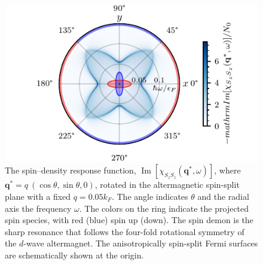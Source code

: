 \documentclass[aps,prl,reprint,twocolumns,superscriptaddress]{revtex4-2}
\DeclareMathOperator{\Imm}{Im}
\newcommand{\kF}{k_{F}}
\begin{document}
	\begin{figure}
		\centering
		\includegraphics[width=\columnwidth]{polar-plot-chiSzSz}
		\caption{
			The spin–density response function, $\Imm[\chi_{S_zS_z}(\bm q^*,\omega)]$, where $\bm q^*=q\ (\cos\theta,\sin\theta,0)$, rotated in the altermagnetic spin-split plane with a fixed $q=0.05\kF$. The angle indicates $\theta$ and the radial axis the frequency $\omega$. The colors on the ring indicate the projected spin species, with red (blue) spin up (down). The spin demon is the sharp resonance that follows the four-fold rotational symmetry of the $d$-wave altermagnet. The anisotropically spin-split Fermi surfaces are schematically shown at the origin. \label{fig:polar}
		}
	\end{figure}
	
\end{document}
